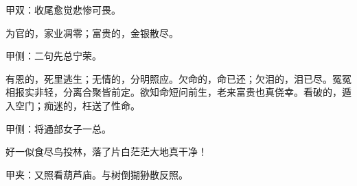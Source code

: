 \begin{qute}
    \begin{note}甲双：收尾愈觉悲惨可畏。\end{note}
    为官的，家业凋零；富贵的，金银散尽。\begin{note}甲侧：二句先总宁荣。\end{note}有恩的，死里逃生；无情的，分明照应。欠命的，命已还；欠泪的，泪已尽。冤冤相报实非轻，分离合聚皆前定。欲知命短问前生，老来富贵也真侥幸。看破的，遁入空门；痴迷的，枉送了性命。\begin{note}甲侧：将通部女子一总。\end{note}好一似食尽鸟投林，落了片白茫茫大地真干净！\begin{note}甲夹：又照看葫芦庙。与树倒猢狲散反照。\end{note}
\end{qute}
